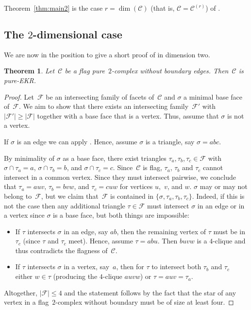 \documentclass[a4paper,12pt]{amsart}
\theoremstyle{plain}
\newtheorem{theorem}{Theorem}[section]
\theoremstyle{definition}
\newcommand{\C}{\mathcal C}
\newcommand{\family}{\mathcal F}
\newcommand{\face}{\sigma}
\newcommand{\smallface}{\tau}
\begin{document}
Theorem~\ref{thm:main2} is the case $r=\dim(\C)$ (that is, $\C=\C^{(r)}$) of .

\subsection{The $2$-dimensional case} We are now in the position to give a short proof of  in dimension two. 

\begin{theorem}
  \label{thm:dim2}
  Let~$\C$ be a flag pure~$2$-complex without boundary edges.
  Then~$\C$ is pure-EKR.
\end{theorem}

 \begin{proof}
  Let~$\family$ be an intersecting family of facets of~$\C$ and $\face$ a minimal base face of~$\family$.
  We aim to show that there exists an intersecting family~$\family'$ with $|\family'| \geq |\family|$ together with a base face that is a vertex. Thus, assume that $\sigma$ is not a vertex.

  If $\face$ is an edge we can apply . Hence, assume $\face$ is a triangle, say $\face = abc$.

  By minimality of $\face$ as a base face, there exist triangles $\smallface_a, \smallface_b, \smallface_c \in \family$ with $\face\cap \smallface_a = a$, $\face\cap \smallface_b = b$, and $\face\cap \smallface_c = c$.
  Since~$\C$ is flag, $\smallface_a$, $\smallface_b$ and $\smallface_c$ cannot intersect in a common vertex. Since they must intersect pairwise, we conclude that $\smallface_a = auv$, $\smallface_b = bvw$, and $\smallface_c = cuw$ for vertices $u$,~$v$, and $w$.
  $\face$ may or may not belong to~$\family$, but we claim that~$\family$ is contained in $\{ \face, \smallface_a, \smallface_b, \smallface_c \}$. Indeed, if this is not the case then any additional triangle $\smallface \in \family$ must intersect $\face$ in an edge or in a vertex since $\sigma$ is a base face, but both things are impossible:
  \begin{itemize}
  \item If $\smallface$ intersects $\face$ in an edge, say $ab$, then the remaining vertex of $\smallface$ must be in $\smallface_c$ (since $\smallface$ and $\smallface_c$ meet). Hence, assume $\smallface=abu$. Then $buvw$ is a $4$-clique and thus contradicts the flagness of~$\C$.
  \item If $\smallface$ intersects $\face$ in a vertex, say~$a$, then for $\smallface$ to intersect both $\smallface_b$ and $\smallface_c$
  either $w\in \smallface$ (producing the $4$-clique $auvw$) or $\smallface = auv =\smallface_a$.
  \end{itemize}
  Altogether, $|\family|\leq 4$ and the statement follows by the fact that the star of any vertex in a flag~$2$-complex without boundary must be of size at least four.
\end{proof}
\end{document}
